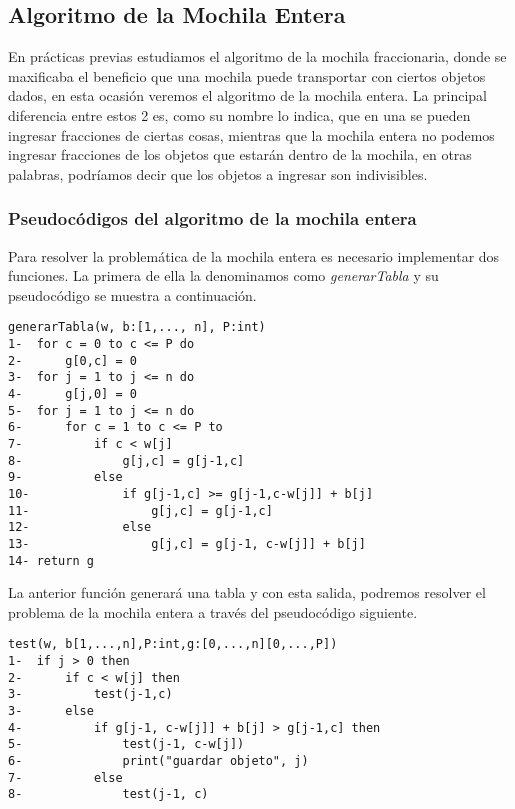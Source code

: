 \documentclass[12pt,twoside]{article}
\begin{document}
\subsection{Algoritmo de la Mochila Entera}
En prácticas previas estudiamos el algoritmo de la mochila fraccionaria, donde se maxificaba el beneficio que una mochila puede transportar con ciertos objetos dados, en esta ocasión veremos el algoritmo de la mochila entera. La principal diferencia entre estos 2 es, como su nombre lo indica, que en una se pueden ingresar fracciones de ciertas cosas, mientras que la mochila entera no podemos ingresar fracciones de los objetos que estarán dentro de la mochila, en otras palabras, podríamos decir que los objetos a ingresar son indivisibles.

\subsubsection{Pseudocódigos del algoritmo de la mochila entera}
Para resolver la problemática de la mochila entera es necesario implementar dos funciones. La primera de ella la denominamos como \textit{generarTabla} y su pseudocódigo se muestra a continuación.
\begin{lstlisting}
generarTabla(w, b:[1,..., n], P:int)
1-  for c = 0 to c <= P do
2-      g[0,c] = 0
3-  for j = 1 to j <= n do
4-      g[j,0] = 0
5-  for j = 1 to j <= n do
6-      for c = 1 to c <= P to
7-          if c < w[j]
8-              g[j,c] = g[j-1,c]
9-          else
10-             if g[j-1,c] >= g[j-1,c-w[j]] + b[j]
11-                 g[j,c] = g[j-1,c]
12-             else
13-                 g[j,c] = g[j-1, c-w[j]] + b[j]
14- return g
\end{lstlisting}
La anterior función generará una tabla y con esta salida, podremos resolver el problema de la mochila entera a través del pseudocódigo siguiente.
\begin{lstlisting}
test(w, b[1,...,n],P:int,g:[0,...,n][0,...,P])
1-  if j > 0 then
2-      if c < w[j] then
3-          test(j-1,c)
3-      else
4-          if g[j-1, c-w[j]] + b[j] > g[j-1,c] then
5-              test(j-1, c-w[j])
6-              print("guardar objeto", j)
7-          else
8-              test(j-1, c)
\end{lstlisting}
\end{document}
